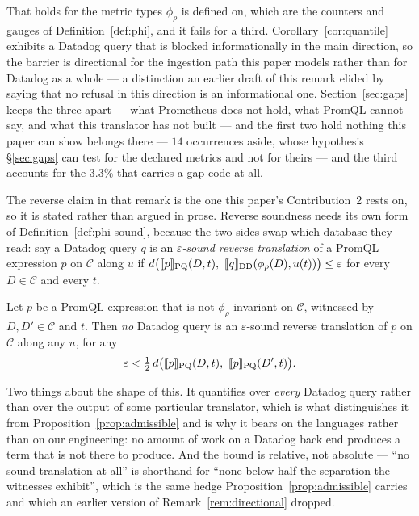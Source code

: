 \begin{remark}
That holds for the metric types $\phi_\rho$ is defined on, which are the counters and
gauges of Definition~\ref{def:phi}, and it fails for a third.
Corollary~\ref{cor:quantile} exhibits a Datadog query that is blocked informationally in
the main direction, so the barrier is directional for the ingestion path this paper
models rather than for Datadog as a whole --- a distinction an earlier draft of this
remark elided by saying that no refusal in this direction is an informational one. Section~\ref{sec:gaps} keeps the three apart --- what Prometheus does
not hold, what PromQL cannot say, and what this translator has not built --- and the
first two hold nothing this paper can show belongs there --- $14$ occurrences aside,
whose hypothesis \S\ref{sec:gaps} can test for the declared metrics and not for
theirs --- and the third accounts for the $3.3\%$ that carries a gap code at all.
\end{remark}

\noindent
The reverse claim in that remark is the one this paper's Contribution~2 rests on, so it
is stated rather than argued in prose. Reverse soundness needs its own form of
Definition~\ref{def:phi-sound}, because the two sides swap which database they read: say
a Datadog query $q$ is an \emph{$\varepsilon$-sound reverse translation} of a PromQL
expression $p$ on $\mathcal{C}$ along $u$ if
$d\big(\sem{p}_{\mathrm{PQ}}(D,t),\ \sem{q}_{\mathrm{DD}}(\phi_\rho(D),u(t))\big)\le\varepsilon$
for every $D\in\mathcal{C}$ and every $t$.

\begin{proposition}\label{prop:reverse}
Let $p$ be a PromQL expression that is not $\phi_\rho$-invariant on $\mathcal{C}$,
witnessed by $D,D'\in\mathcal{C}$ and $t$. Then \emph{no} Datadog query is an
$\varepsilon$-sound reverse translation of $p$ on $\mathcal{C}$ along any $u$, for any
\[
\varepsilon<\tfrac12\,d\big(\sem{p}_{\mathrm{PQ}}(D,t),\ \sem{p}_{\mathrm{PQ}}(D',t)\big).
\]
\end{proposition}
\iffull\fi

\noindent
Two things about the shape of this. It quantifies over \emph{every} Datadog query rather
than over the output of some particular translator, which is what distinguishes it from
Proposition~\ref{prop:admissible} and is why it bears on the languages rather than on our
engineering: no amount of work on a Datadog back end produces a term that is not there to
produce. And the bound is relative, not absolute --- ``no sound translation at all''
is shorthand for ``none below half the separation the witnesses exhibit'', which is the
same hedge Proposition~\ref{prop:admissible} carries and which an earlier version of
Remark~\ref{rem:directional} dropped.

